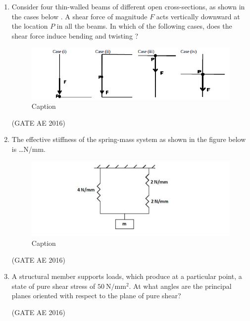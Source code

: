 \documentclass[journal,12pt,onecolumn]{IEEEtran}
\theoremstyle{remark}
\begin{document}
\begin{enumerate}
\item Consider four thin-walled beams of different open cross-sections, as shown in the cases below . A shear force of magnitude $F$ acts vertically downward at the location $P$ in all the beams. In which of the following cases, does the shear force induce bending and twisting ?
\begin{figure}[H]
    \centering
    \includegraphics[width=0.5\columnwidth]{figs/Screenshot from 2025-08-15 18-43-29.png}
    \caption{Caption}
    \label{fig:placeholder}
\end{figure}
\begin{enumerate}
\end{enumerate}
\hfill(GATE AE 2016)



\item The effective stiffness of the spring-mass system as shown in the figure below is \dots N/mm.
\begin{figure}[H]
    \centering
    \includegraphics[width=0.5\columnwidth]{figs/Screenshot from 2025-08-15 18-43-56.png}
    \caption{Caption}
    \label{fig:placeholder}
\end{figure}
\hfill(GATE AE 2016)



\item A structural member supports loads, which produce at a particular point, a state of pure shear stress of $50~\mathrm{N}/\mathrm{mm}^2$. At what angles are the principal planes oriented with respect to the plane of pure shear?  
\begin{enumerate}
\end{enumerate}
\hfill(GATE AE 2016)




\end{enumerate}
\end{document}

